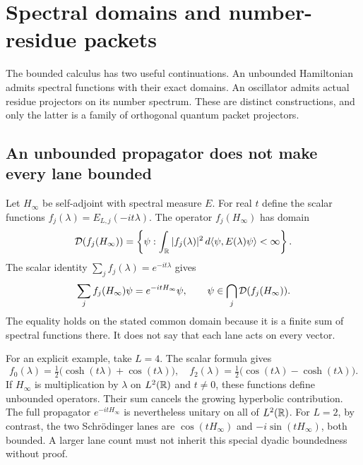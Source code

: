 \section{Spectral domains and number-residue packets}
\label{a-spectral-domains-packets}

The bounded calculus has two useful continuations. An unbounded
Hamiltonian admits spectral functions with their exact domains.
An oscillator admits actual residue projectors on its number spectrum.
These are distinct constructions, and only the latter is a family of
orthogonal quantum packet projectors.

\subsection{An unbounded propagator does not make every lane bounded}

Let $H_\infty$ be self-adjoint with spectral measure $E$. For real $t$
define the scalar functions
$f_j(\lambda)=E_{L,j}(-it\lambda)$.
The operator $f_j(H_\infty)$ has domain
\begin{equation}
 \mathcal D(f_j(H_\infty))
 =\left\{\psi:\int_{\mathbb R}|f_j(\lambda)|^2
                       \,d\langle\psi,E(\lambda)\psi\rangle<\infty\right\}.
 \label{a-spectral-lane-domain}
\end{equation}
The scalar identity $\sum_jf_j(\lambda)=e^{-it\lambda}$ gives
\begin{equation}
 \sum_jf_j(H_\infty)\psi=e^{-itH_\infty}\psi,
 \qquad \psi\in\bigcap_j\mathcal D(f_j(H_\infty)).
 \label{a-spectral-unbounded-reconstruction}
\end{equation}
The equality holds on the stated common domain because it is a finite
sum of spectral functions there. It does not say that each lane acts
on every vector.

For an explicit example, take $L=4$. The scalar formula gives
\[
 f_0(\lambda)=\tfrac12\bigl(\cosh(t\lambda)+\cos(t\lambda)\bigr),
 \quad
 f_2(\lambda)=\tfrac12\bigl(\cos(t\lambda)-\cosh(t\lambda)\bigr).
\]
If $H_\infty$ is multiplication by $\lambda$ on $L^2(\mathbb R)$ and
$t\ne0$, these functions define unbounded operators. Their sum
cancels the growing hyperbolic contribution. The full propagator
$e^{-itH_\infty}$ is nevertheless unitary on all of $L^2(\mathbb R)$.
For $L=2$, by contrast, the two Schr\"odinger lanes are
$\cos(tH_\infty)$ and $-i\sin(tH_\infty)$, both bounded. A larger
lane count must not inherit this special dyadic boundedness without proof.

